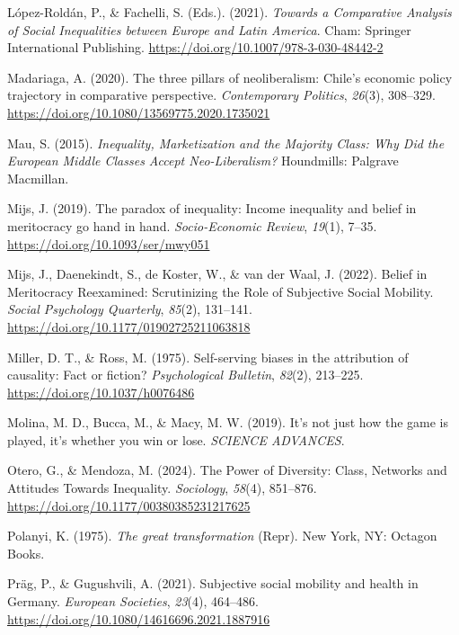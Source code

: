 \documentclass[
  12pt,
]{article}
\newlength{\cslhangindent}
\newenvironment{CSLReferences}[2] %
 {\begin{list}{}{%
  \setlength{\itemindent}{0pt}
  \setlength{\leftmargin}{0pt}
  \setlength{\parsep}{0pt}
  \ifodd #1
   \setlength{\leftmargin}{\cslhangindent}
   \setlength{\itemindent}{-1\cslhangindent}
  \fi
  \setlength{\itemsep}{#2\baselineskip}}}
 {\end{list}}
\begin{document}
\begin{CSLReferences}{1}{0}
López-Roldán, P., \& Fachelli, S. (Eds.). (2021). \emph{Towards a
{Comparative Analysis} of {Social Inequalities} between {Europe} and
{Latin America}}. Cham: Springer International Publishing.
\url{https://doi.org/10.1007/978-3-030-48442-2}

Madariaga, A. (2020). The three pillars of neoliberalism: {Chile}'s
economic policy trajectory in comparative perspective.
\emph{Contemporary Politics}, \emph{26}(3), 308--329.
\url{https://doi.org/10.1080/13569775.2020.1735021}

Mau, S. (2015). \emph{Inequality, {Marketization} and the {Majority
Class}: {Why Did} the {European Middle Classes Accept Neo-Liberalism}?}
Houndmills: Palgrave Macmillan.

Mijs, J. (2019). The paradox of inequality: Income inequality and belief
in meritocracy go hand in hand. \emph{Socio-Economic Review},
\emph{19}(1), 7--35. \url{https://doi.org/10.1093/ser/mwy051}

Mijs, J., Daenekindt, S., de Koster, W., \& van der Waal, J. (2022).
Belief in {Meritocracy Reexamined}: {Scrutinizing} the {Role} of
{Subjective Social Mobility}. \emph{Social Psychology Quarterly},
\emph{85}(2), 131--141. \url{https://doi.org/10.1177/01902725211063818}

Miller, D. T., \& Ross, M. (1975). Self-serving biases in the
attribution of causality: {Fact} or fiction? \emph{Psychological
Bulletin}, \emph{82}(2), 213--225.
\url{https://doi.org/10.1037/h0076486}

Molina, M. D., Bucca, M., \& Macy, M. W. (2019). It's not just how the
game is played, it's whether you win or lose. \emph{SCIENCE ADVANCES}.

Otero, G., \& Mendoza, M. (2024). The {Power} of {Diversity}: {Class},
{Networks} and {Attitudes Towards Inequality}. \emph{Sociology},
\emph{58}(4), 851--876. \url{https://doi.org/10.1177/00380385231217625}

Polanyi, K. (1975). \emph{The great transformation} (Repr). New York,
NY: Octagon Books.

Präg, P., \& Gugushvili, A. (2021). Subjective social mobility and
health in {Germany}. \emph{European Societies}, \emph{23}(4), 464--486.
\url{https://doi.org/10.1080/14616696.2021.1887916}


\end{CSLReferences}
\end{document}

